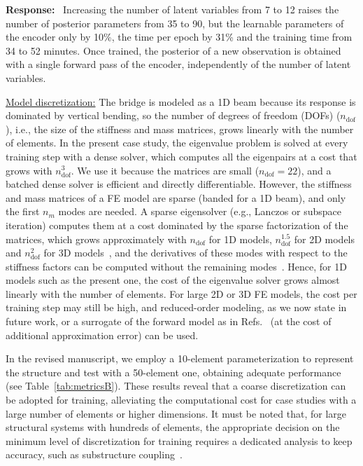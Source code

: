 \documentclass[11pt]{article}
\newenvironment{response}{\par\smallskip\noindent\color{resp}\textbf{Response:}\ }{\par}
\begin{document}
\begin{response}
Increasing the number of latent variables from 7 to 12 raises the number of posterior parameters from 35 to 90, but the learnable parameters of the encoder only by 10\%, the time per epoch by 31\% and the training time from 34 to 52 minutes. 
Once trained, the posterior of a new observation is obtained with a single forward pass of the encoder, independently of the number of latent variables.

\underline{Model discretization:}
The bridge is modeled as a 1D beam because its response is dominated by vertical bending, so the number of degrees of freedom (DOFs) ($n_{\text{dof}}$), i.e., the size of the stiffness and mass matrices, grows linearly with the number of elements. 
In the present case study, the eigenvalue problem is solved at every training step with a dense solver, which computes all the eigenpairs at a cost that grows with $n_{\text{dof}}^3$.
We use it because the matrices are small ($n_{\text{dof}}=22$), and a batched dense solver is efficient and directly differentiable.
However, the stiffness and mass matrices of a FE model are sparse (banded for a 1D beam), and only the first $n_m$ modes are needed.
A sparse eigensolver (e.g., Lanczos or subspace iteration) computes them at a cost dominated by the sparse factorization of the matrices, which grows approximately with $n_{\text{dof}}$ for 1D models, $n_{\text{dof}}^{1.5}$ for 2D models and $n_{\text{dof}}^{2}$ for 3D models~\cite{george1973nested}, and the derivatives of these modes with respect to the stiffness factors can be computed without the remaining modes~\cite{nelson1976simplified}.
Hence, for 1D models such as the present one, the cost of the eigenvalue solver grows almost linearly with the number of elements.
For large 2D or 3D FE models, the cost per training step may still be high, and reduced-order modeling, as we now state in future work, or a surrogate of the forward model as in Refs.~\cite{Navamuel_wes2025,Arxiv_Navamuel2026copula2d} (at the cost of additional approximation error) can be used.

 
In the revised manuscript, we employ a 10-element parameterization to represent the structure and test with a 50-element one, obtaining adequate performance (see Table~\ref{tab:metricsB}). 
These results reveal that a coarse discretization can be adopted for training, alleviating the computational cost for case studies with a large number of elements or higher dimensions. 
It must be noted that, for large structural systems with hundreds of elements, the appropriate decision on the minimum level of discretization for training requires a dedicated analysis to keep accuracy, such as substructure coupling~\cite{jensen2019sub}. 


\end{response}
\end{document}
